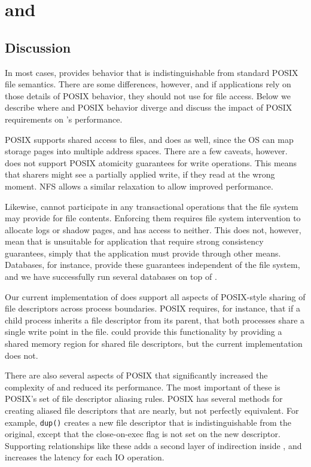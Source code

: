 \section{\Muse{} and \Switch{}}
\label{sec:quill-limit}


\subsection{Discussion}

In most cases, \Muse{} provides behavior that is indistinguishable
from standard POSIX file semantics.  There are some differences, however, and
if applications rely on those details of POSIX behavior, they should not use
\Muse{} for file access.  Below we describe where \Muse{} and POSIX behavior
diverge and discuss the impact of POSIX requirements on \Muse{}'s performance.

POSIX supports shared access to files, and \Muse{} does as well, since the OS
can map storage pages into multiple address spaces.  There are a few caveats,
however.  \Muse{} does not support POSIX atomicity guarantees for write operations.
This means that sharers might see a partially applied write, if they read at
the wrong moment.  NFS allows a similar relaxation to allow improved
performance.

Likewise, \Muse{} cannot participate in any transactional operations that the
file system may provide for file contents.  Enforcing them requires file system intervention to allocate logs or
shadow pages, and \Muse{} has access to neither.  This does not, however, mean
that \Muse{} is unsuitable for application that require strong consistency
guarantees, simply that the application must provide through other means.
Databases, for instance, provide these guarantees independent of the file system, and we have successfully run several databases on top of \Muse{}.

Our current implementation of \Muse{} does support all aspects of POSIX-style
sharing of file descriptors across process boundaries.  POSIX requires, for
instance, that if a child process inherits a file descriptor from its parent,
that both processes share a single write point in the file.  \Muse{} could
provide this functionality by providing a shared memory region for shared file
descriptors, but the current implementation does not.

There are also several aspects of POSIX that significantly increased the
complexity of \Muse{} and reduced its performance.  The most important of these
is POSIX's set of file descriptor aliasing rules.  POSIX has several methods
for creating aliased file descriptors that are nearly, but not perfectly
equivalent.  For example, \texttt{dup()} creates a new file descriptor that is
indistinguishable from the original, except that the close-on-exec flag is not
set on the new descriptor.  Supporting relationships like these adds a second
layer of indirection inside \Muse{}, and increases the latency for each IO
operation.  

